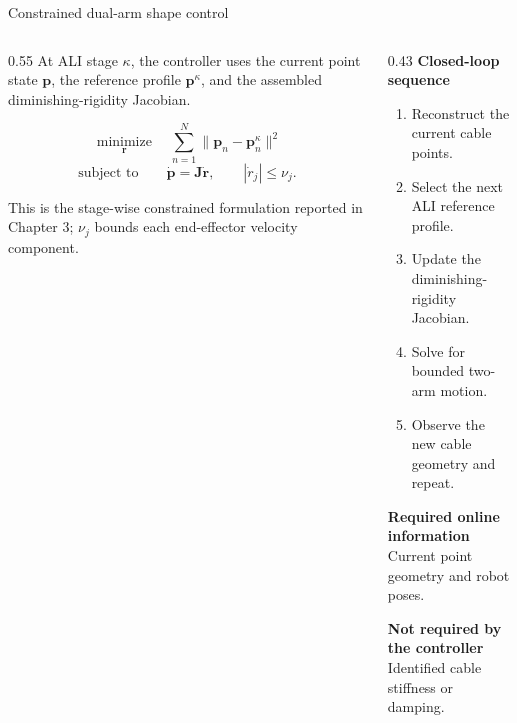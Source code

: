 \documentclass[aspectratio=169,10pt]{beamer}
\begin{document}
\begin{frame}[t]{Constrained dual-arm shape control}
  \begin{columns}[T,onlytextwidth]
    \begin{column}{0.55\textwidth}
      \small
      At ALI stage \(\kappa\), the controller uses the current point state
      \(\bm p\), the reference profile \(\bm p^\kappa\), and the assembled
      diminishing-rigidity Jacobian.

      \[
        \underset{\bm r}{\operatorname{minimize}}\quad
        \sum_{n=1}^{N}
        \|\bm p_n-\bm p_n^\kappa\|^2
      \]
      \[
        \text{subject to}\qquad
        \dot{\bm p}=\bm J\dot{\bm r},
        \qquad
        |\dot r_j|\le \nu_j .
      \]

      \footnotesize This is the stage-wise constrained formulation reported in
      Chapter 3; \(\nu_j\) bounds each end-effector velocity component.
    \end{column}
    \begin{column}{0.43\textwidth}
      \small
      \textbf{Closed-loop sequence}
      \begin{enumerate}
        \item Reconstruct the current cable points.
        \item Select the next ALI reference profile.
        \item Update the diminishing-rigidity Jacobian.
        \item Solve for bounded two-arm motion.
        \item Observe the new cable geometry and repeat.
      \end{enumerate}

      \vspace{0.20cm}
      \textbf{Required online information}\\
      Current point geometry and robot poses.

      \vspace{0.16cm}
      \textbf{Not required by the controller}\\
      Identified cable stiffness or damping.
    \end{column}
  \end{columns}

\end{frame}
\end{document}
